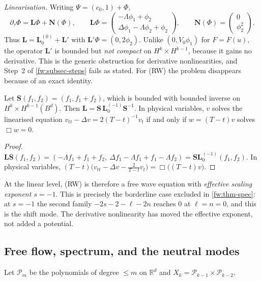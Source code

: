 \emph{Linearisation.} Writing $\Psi=(c_0,1)+\Phi$,
\begin{equation}\label{acou:lin}
  \partial_\tau\Phi=\mathbf L\Phi+\mathbf N(\Phi),\qquad
  \mathbf L\Phi=\begin{pmatrix}-\Lambda\phi_1+\phi_2\\ \Delta\phi_1-\Lambda\phi_2+\phi_2\end{pmatrix},\qquad
  \mathbf N(\Phi)=\begin{pmatrix}0\\ \phi_2^2\end{pmatrix}.
\end{equation}
Thus $\mathbf L=\mathbf L_0^{(0)}+\mathbf L'$ with $\mathbf L'\Phi=(0,2\phi_2)$.
Unlike $(0,V_0\phi_1)$ for $F=F(u)$, the operator $\mathbf L'$ is bounded but
\emph{not compact} on $H^k\times H^{k-1}$, because it gains no derivative.
This is the generic obstruction for derivative nonlinearities, and Step~2 of
\cref{fw:subsec-steps} fails as stated. For (RW) the problem disappears
because of an exact identity.

\begin{lemma}\label{acou:lem-conj}
Let $\mathbf S(f_1,f_2)=(f_1,f_1+f_2)$, which is bounded with bounded inverse
on $H^k\times H^{k-1}(B^d)$. Then
$\mathbf L=\mathbf S\,\mathbf L_0^{(-1)}\mathbf S^{-1}$. In physical variables,
$v$ solves the linearised equation $v_{tt}-\Delta v=2(T-t)^{-1}v_t$ if and
only if $w=(T-t)v$ solves $\Box w=0$.
\end{lemma}
\begin{proof}
$\mathbf L\mathbf S(f_1,f_2)=(-\Lambda f_1+f_1+f_2,\ \Delta f_1-\Lambda f_1+f_1-\Lambda f_2)
=\mathbf S\mathbf L_0^{(-1)}(f_1,f_2)$. In physical variables,
$(T-t)\big(v_{tt}-\Delta v-\tfrac{2}{T-t}v_t\big)=\Box\big((T-t)v\big)$.
\end{proof}
At the linear level, (RW) is therefore a free wave equation with
\emph{effective scaling exponent $s=-1$}. This is precisely the borderline
case excluded in \cref{fw:thm-spec}: at $s=-1$ the second family
$-2s-2-\ell-2n$ reaches $0$ at $\ell=n=0$, and this is the shift mode. The
derivative nonlinearity has moved the effective exponent, not added a
potential.

\subsection{Free flow, spectrum, and the neutral modes}
\label{acou:sub-spec}
Let $\mathcal P_m$ be the polynomials of degree $\le m$ on $\mathbb R^d$ and
$X_k=\mathcal P_{k-1}\times\mathcal P_{k-2}$.

